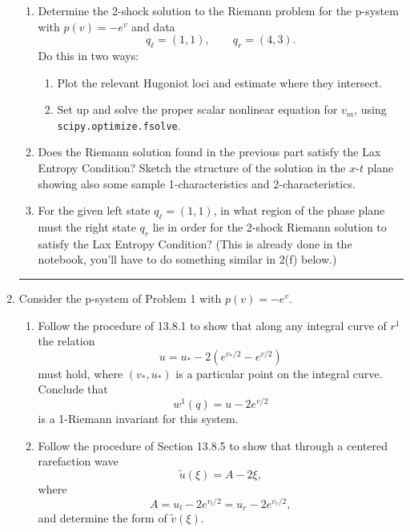 \documentclass[11pt]{article}
\begin{document}
\begin{enumerate}
\begin{enumerate}
\item Determine the 2-shock solution to the Riemann problem for the p-system
with $p(v) = -e^v$ and data
\[
q_\ell = (1,1), \qquad q_r = (4,3).
\]
Do this in two ways:
 \begin{enumerate} 
 \item Plot the relevant Hugoniot loci and estimate where they intersect.
 \item Set up and solve the proper scalar nonlinear equation for $v_m$, 
 using \verb+scipy.optimize.fsolve+.
 \end{enumerate} 

\item Does the Riemann solution found in the previous part
satisfy the Lax Entropy
Condition?  Sketch the structure of the solution in the $x$-$t$ plane
showing also some sample 1-characteristics and 2-characteristics.

\item For the given left state $q_\ell = (1,1)$, in what region of the phase 
plane must the
right state $q_r$ lie in order for the 2-shock Riemann solution to satisfy
the Lax Entropy Condition?  
(This is already done in the notebook, you'll have to do something similar
in 2(f) below.)

\end{enumerate} 





\vskip 1cm
\hrule
\item

Consider the p-system of Problem 1 with $p(v) = -e^v$.

\begin{enumerate}
\item Follow the procedure of 13.8.1 to show that along any
integral curve of $r^1$ the relation 
\[
u = u_* - 2\left( e^{v_*/2} - e^{v/2}\right)
\]
must hold, where $(v_*,u_*)$ is a particular point on the integral curve.
Conclude that 
\[
w^1(q) = u - 2e^{v/2}
\]
is a 1-Riemann invariant for this system.

\item Follow the procedure of Section 13.8.5 to show that through a centered
rarefaction wave 
\[
\tilde u(\xi) = A - 2\xi,
\]
where 
\[
A = u_l - 2 e^{v_l/2} = u_r - 2e^{v_r/2},
\]
and determine the form of $\tilde v(\xi)$.



\end{enumerate}
\end{enumerate}
\end{document}
